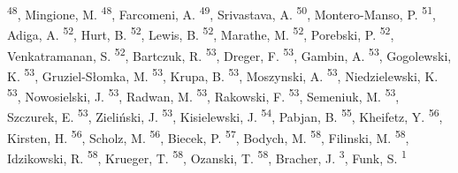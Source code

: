 \documentclass[
]{article}
\begin{document}
\textsuperscript{48}, Mingione, M. \textsuperscript{48}, Farcomeni, A. \textsuperscript{49}, Srivastava, A. \textsuperscript{50}, Montero-Manso, P. \textsuperscript{51}, Adiga, A. \textsuperscript{52}, Hurt, B. \textsuperscript{52}, Lewis, B. \textsuperscript{52}, Marathe, M. \textsuperscript{52}, Porebski, P. \textsuperscript{52}, Venkatramanan, S. \textsuperscript{52}, Bartczuk, R. \textsuperscript{53}, Dreger, F. \textsuperscript{53}, Gambin, A. \textsuperscript{53}, Gogolewski, K. \textsuperscript{53}, Gruziel-Słomka, M. \textsuperscript{53}, Krupa, B. \textsuperscript{53}, Moszynski, A. \textsuperscript{53}, Niedzielewski, K. \textsuperscript{53}, Nowosielski, J. \textsuperscript{53}, Radwan, M. \textsuperscript{53}, Rakowski, F. \textsuperscript{53}, Semeniuk, M. \textsuperscript{53}, Szczurek, E. \textsuperscript{53}, Zieliński, J. \textsuperscript{53}, Kisielewski, J. \textsuperscript{54}, Pabjan, B. \textsuperscript{55}, Kheifetz, Y. \textsuperscript{56}, Kirsten, H. \textsuperscript{56}, Scholz, M. \textsuperscript{56}, Biecek, P. \textsuperscript{57}, Bodych, M. \textsuperscript{58}, Filinski, M. \textsuperscript{58}, Idzikowski, R. \textsuperscript{58}, Krueger, T. \textsuperscript{58}, Ozanski, T. \textsuperscript{58}, Bracher, J. \textsuperscript{3}, Funk, S. \textsuperscript{1}
\end{document}
